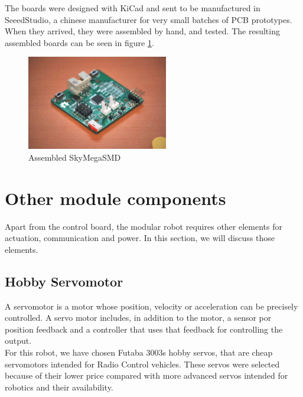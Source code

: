 The boards were designed with KiCad and sent to be manufactured in SeeedStudio, a chinese manufacturer for very small batches of PCB prototypes. When they arrived, they were assembled by hand, and tested. The resulting assembled boards can be seen in figure \ref{fig:hardware_skymegasmd}.


\begin{figure}[h]
		\centering
        \includegraphics[width=0.55\textwidth]{images/Hardware_skymegasmd.jpg}
        \caption{Assembled SkyMegaSMD}
        \label{fig:hardware_skymegasmd}
\end{figure} 


\section{Other module components}
\label{hardware_electronics_other}

Apart from the control board, the modular robot requires other elements for actuation, communication and power. In this section, we will discuss those elements.

\subsection{Hobby Servomotor}
A servomotor is a motor whose position, velocity or acceleration can be precisely controlled. A servo motor includes, in addition to the motor, a sensor por position feedback and a controller that uses that feedback for controlling the output.\\

For this robot, we have chosen Futaba 3003s hobby servos, that are cheap servomotors intended for Radio Control vehicles. These servos were selected because of their lower price compared with more advanced servos intended for robotics and their availability.\\

